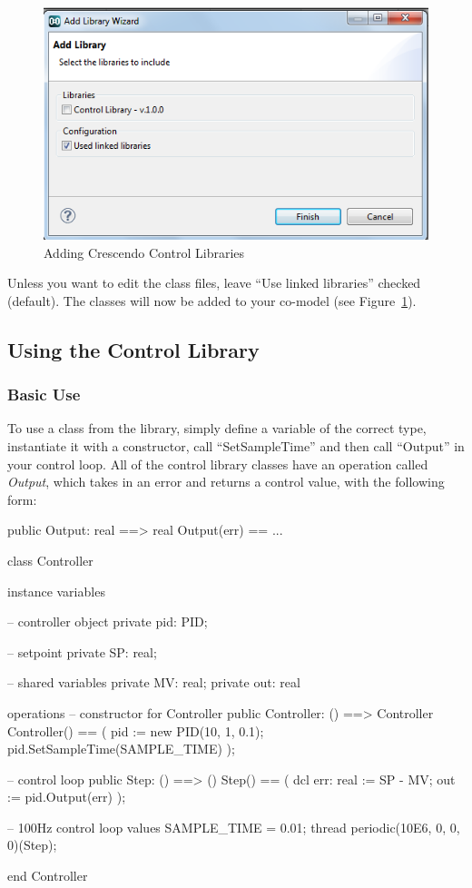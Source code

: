 \documentclass{crescendorepchap}
\begin{document}
\begin{figure}[htbp]
\centering
\includegraphics[width=.6\textwidth]{images/DestecsAddNewLibrary.png}
\caption{Adding Crescendo Control Libraries\label{fig:crescendoLibNew}}
\end{figure}

Unless you want to edit the class files, leave ``Use linked libraries''
checked (default). The classes will now be added to your co-model (see Figure~\ref{fig:crescendoLibNew}).

\subsection{Using the Control Library}

\subsubsection{Basic Use}

To use a class from the library, simply define a variable of the correct
type, instantiate it with a constructor, call ``SetSampleTime'' and then
call ``Output'' in your control loop. All of the control library classes
have an operation called \emph{Output}, which takes in an error and
returns a control value, with the following form:

\begin{vdmrt}
public Output: real ==> real
Output(err) == ...

class Controller

instance variables

-- controller object
private pid: PID;

-- setpoint
private SP: real;

-- shared variables
private MV: real;
private out: real

operations
-- constructor for Controller
public Controller: () ==> Controller
Controller() ==
(
pid := new PID(10, 1, 0.1);
pid.SetSampleTime(SAMPLE_TIME)
);

-- control loop
public Step: () ==> ()
Step() ==
(
dcl err: real := SP - MV;
out := pid.Output(err)
);

-- 100Hz control loop
values SAMPLE_TIME = 0.01;
thread periodic(10E6, 0, 0, 0)(Step);

end Controller
\end{vdmrt}
\end{document}
